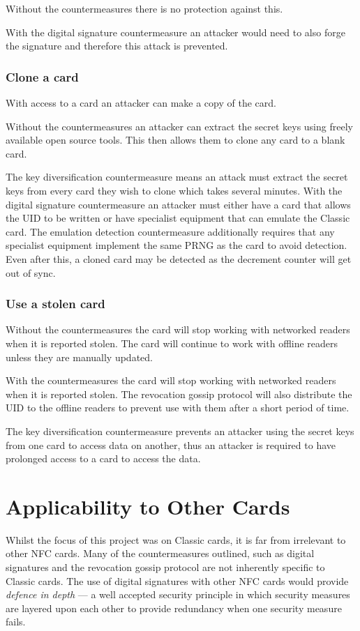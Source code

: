 \documentclass[dissertation.tex]{subfiles}
\begin{document}
  Without the countermeasures there is no protection against this.

  With the digital signature countermeasure an attacker would need to also forge the signature and therefore this attack is prevented.

  \subsubsection{Clone a card}
  With access to a card an attacker can make a copy of the card.

  Without the countermeasures an attacker can extract the secret keys using freely available open source tools. This then allows them to clone any card to a blank card.


  The key diversification countermeasure means an attack must extract the secret keys from every card they wish to clone which takes several minutes. With the digital signature countermeasure an attacker must either have a card that allows the UID to be written or have specialist equipment that can emulate the \mifare{} Classic card. The emulation detection countermeasure additionally requires that any specialist equipment implement the same PRNG as the \mifare{} card to avoid detection. Even after this, a cloned card may be detected as the decrement counter will get out of sync.

  \subsubsection{Use a stolen card}
  Without the countermeasures the card will stop working with networked readers when it is reported stolen. The card will continue to work with offline readers unless they are manually updated.

  With the countermeasures the card will stop working with networked readers when it is reported stolen. The revocation gossip protocol will also  distribute the UID to the offline readers to prevent use with them after a short period of time.


  The key diversification countermeasure prevents an attacker using the secret keys from one card to access data on another, thus an attacker is required to have prolonged access to a card to access the data.

  \section{Applicability to Other Cards}
  Whilst the focus of this project was on \mifare{} Classic cards, it is far from irrelevant to other NFC cards. Many of the countermeasures outlined, such as digital signatures and the revocation gossip protocol are not inherently specific to \mifare{} Classic cards. The use of digital signatures with other NFC cards would provide \emph{defence in depth} --- a well accepted security principle in which security measures are layered upon each other to provide redundancy when one security measure fails.
\end{document}
